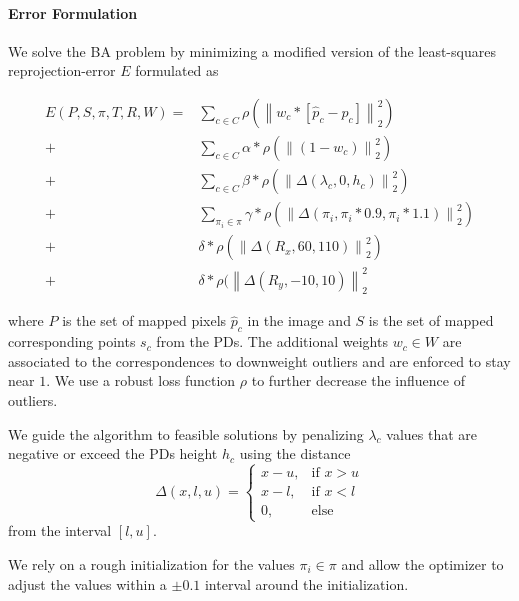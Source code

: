\paragraph{Error Formulation}
We solve the BA problem by minimizing a modified version of the least-squares reprojection-error $E$ formulated as

\begin{equation}
  \begin{split}
  E(P, S, \pi, T, R, W ) =& 
  \sum_{c \in C} 
  \rho(\left\lVert 
    w_c * [ \hat{p}_c - p_c ]
  \right\rVert^2_2) \\ 
  +& 
  \sum_{c \in C} 
  \alpha * 
  \rho(\left\lVert 
  (1 - w_c)
  \right\rVert^2_2) \\ 
  +& 
  \sum_{c \in C} 
  \beta * 
  \rho(\left\lVert 
  \Delta(\lambda_c, 0, h_c)
  \right\rVert^2_2) \\ 
  +& 
  \sum_{\pi_i \in \pi} 
  \gamma *
  \rho(\left\lVert 
  \Delta (\pi_i, \pi_i * 0.9, \pi_i * 1.1)
  \right\rVert^2_2) \\
  +&
  \delta * 
  \rho(\left\lVert 
  \Delta (R_x, 60, 110)
  \right\rVert^2_2) \\
  +&
  \delta * 
  \rho(\left\lVert 
  \Delta (R_y, -10, 10)
  \right\rVert^2_2 
\end{split}
\label{eq:reprojection_error}
\end{equation}

where $P$ is the set of mapped pixels $\hat{p}_c$ in the image and $S$ is the set of mapped corresponding points $s_c$ from the PDs.  
The additional weights $w_c \in W$ are associated to the correspondences to downweight outliers and are enforced to stay near $1$.
We use a robust loss function $\rho$ to further decrease the influence of outliers.

We guide the algorithm to feasible solutions by penalizing $\lambda_c$ values that are negative or exceed the PDs height $h_c$ using the distance 
\begin{equation}
    \Delta (x, l, u) =
    \begin{cases}
      x - u,& \text{if } x > u\\
      x - l,& \text{if } x < l\\
      0,    & \text{else}
    \end{cases} 
\end{equation}
from the interval $[l, u]$.

We rely on a rough initialization for the values $\pi_i \in \pi$ and allow the optimizer to adjust the values within a $\pm 0.1$ interval around the initialization. 

